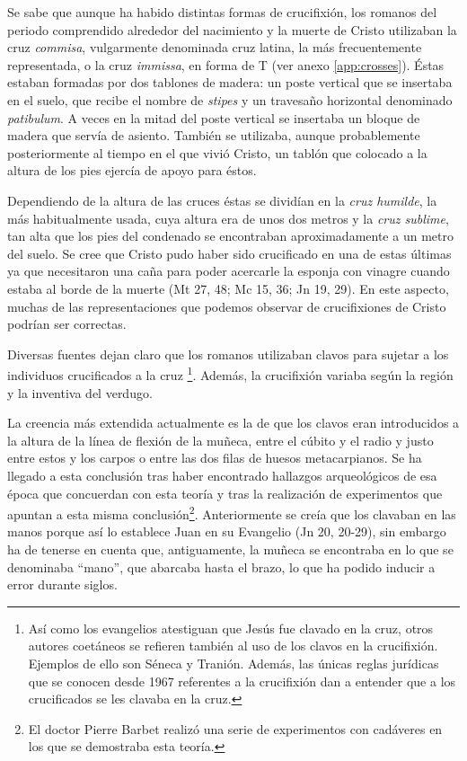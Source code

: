 Se sabe que aunque ha habido distintas formas de crucifixión, los romanos del periodo comprendido alrededor del nacimiento y la muerte de Cristo utilizaban la cruz \textit{commisa}, vulgarmente denominada cruz latina, la más frecuentemente representada, o la cruz \textit{immissa}, en forma de T (ver anexo \autoref{app:crosses}). Éstas estaban formadas por dos tablones de madera: un poste vertical que se insertaba en el suelo, que recibe el nombre de \textit{stipes} y un travesaño horizontal denominado \textit{patibulum}. A veces en la mitad del poste vertical se insertaba un bloque de madera que servía de asiento. También se utilizaba, aunque probablemente posteriormente al tiempo en el que vivió Cristo, un tablón que colocado a la altura de los pies ejercía de apoyo para éstos.

Dependiendo de la altura de las cruces éstas se dividían en la \textit{cruz humilde}, la más habitualmente usada, cuya altura era de unos dos metros y la \textit{cruz sublime}, tan alta que los pies del condenado se encontraban aproximadamente a un metro del suelo. Se cree que Cristo pudo haber sido crucificado en una de estas últimas ya que necesitaron una caña para poder acercarle la esponja con vinagre cuando estaba al borde de la muerte (Mt 27, 48; Mc 15, 36; Jn 19, 29). En este aspecto, muchas de las representaciones que podemos observar de crucifixiones de Cristo podrían ser correctas.

Diversas fuentes dejan claro que los romanos utilizaban clavos para sujetar a los individuos crucificados a la cruz \footnote{Así como los evangelios atestiguan que Jesús fue clavado en la cruz, otros autores coetáneos se refieren también al uso de los clavos en la crucifixión. Ejemplos de ello son Séneca y Tranión. Además, las únicas reglas jurídicas que se conocen desde 1967 referentes a la crucifixión dan a entender que a los crucificados se les clavaba en la cruz.}. Además, la crucifixión variaba según la región y la inventiva del verdugo.

La creencia más extendida actualmente es la de que los clavos eran introducidos a la altura de la línea de flexión  de la muñeca, entre el cúbito y el radio y justo entre estos y los carpos o entre las dos filas de huesos metacarpianos. Se ha llegado a esta conclusión tras haber encontrado hallazgos arqueológicos de esa época que concuerdan con esta teoría y tras la realización de experimentos que apuntan a esta misma conclusión\footnote{El doctor Pierre Barbet realizó una serie de experimentos con cadáveres en los que se demostraba esta teoría.}. Anteriormente se creía que los clavaban en las manos porque así lo establece Juan en su Evangelio (Jn 20, 20-29), sin embargo ha de tenerse en cuenta que, antiguamente, la muñeca se encontraba en lo que se denominaba ``mano'', que abarcaba hasta el brazo, lo que ha podido inducir a error durante siglos.

